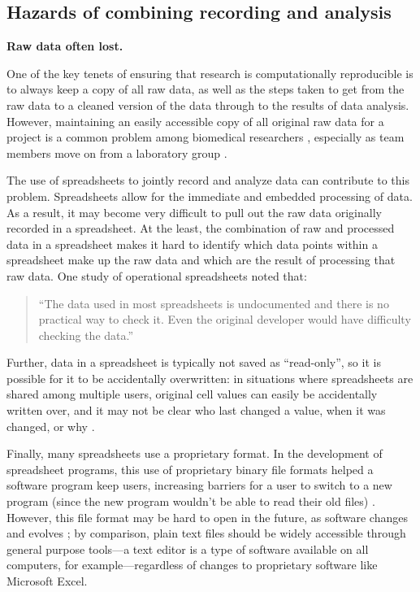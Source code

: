 \documentclass[]{tufte-book}
\begin{document}
\hypertarget{hazards-of-combining-recording-and-analysis}{%
\subsection{Hazards of combining recording and analysis}\label{hazards-of-combining-recording-and-analysis}}

\textbf{Raw data often lost.}

One of the key tenets of ensuring that research is computationally reproducible
is to always keep a copy of all raw data, as well as the steps taken to get from
the raw data to a cleaned version of the data through to the results of data
analysis. However, maintaining an easily accessible copy of all original raw data
for a project is a common problem among biomedical researchers
\citep{goodman2014ten}, especially as team members move on from a laboratory group
\citep{myneni2010organization}.

The use of spreadsheets to jointly record and analyze data can contribute to
this problem. Spreadsheets allow for the immediate and embedded processing of
data. As a result, it may become very difficult to pull out the raw data
originally recorded in a spreadsheet. At the least, the combination of raw and
processed data in a spreadsheet makes it hard to identify which data points
within a spreadsheet make up the raw data and which are the result of processing
that raw data. One study of operational spreadsheets noted that:

\begin{quote}
``The data used in most spreadsheets is undocumented and there is no practical
way to check it. Even the original developer would have difficulty checking the
data.'' \citep{powell2009errors}
\end{quote}

Further, data in a spreadsheet is typically not saved as ``read-only'', so it is
possible for it to be accidentally overwritten: in situations where spreadsheets
are shared among multiple users, original cell values can easily be accidentally
written over, and it may not be clear who last changed a value, when it was
changed, or why \citep{altarawneh2017pilot}.

Finally, many spreadsheets use a proprietary format. In the development of
spreadsheet programs, this use of proprietary binary file formats helped a
software program keep users, increasing barriers for a user to switch to a new
program (since the new program wouldn't be able to read their old files)
\citep{campbell2007number}. However, this file format may be hard to open in the
future, as software changes and evolves \citep{michener2015ten}; by comparison, plain
text files should be widely accessible through general purpose tools---a text
editor is a type of software available on all computers, for
example---regardless of changes to proprietary software like Microsoft Excel.
\end{document}
